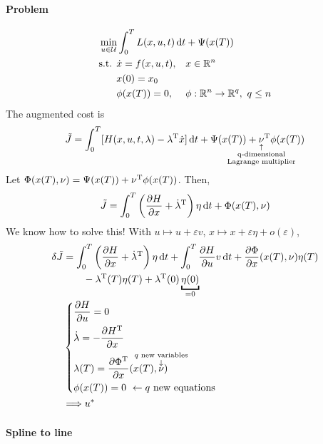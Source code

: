 \paragraph{Problem}
\begin{align}
  & \min_{u\in\mathcal U} \int_0^T L(x,u,t)\mathop{}\!\mathrm{d} t + \Psi(x(T)) \\
  & \text{s.t. } \begin{aligned}[t]
    & \dot x = f(x,u,t), && x\in\mathbb{R}^n \\
    & x(0) = x_0 \\
    & \phi(x(T)) = 0, && \phi:\mathbb{R}^n\to\mathbb{R}^q,\ q\le n
  \end{aligned}
\end{align}
The augmented cost is
\[
  \tilde J = \int_0^T [ H(x,u,t,\lambda) - \lambda\trans \dot x]\dif t + \Psi(x(T)) + \underset{\mathclap{\substack{\uparrow\\ \text{q-dimensional}\\ \text{Lagrange multiplier}}}}{\nu}\trans \phi(x(T))
\]
Let $\Phi(x(T),\nu)=\Psi(x(T)) + \nu^\text{T}\phi(x(T))$. Then,
\[
  \tilde J = \int_0^T \left( \frac{\partial H}{\partial x} + \dot\lambda^\text{T} \right) \eta \mathop{}\!\mathrm{d} t + \Phi(x(T),\nu)
\]
We know how to solve this! With $u\mapsto u+\varepsilon v$, $x\mapsto x+\varepsilon\eta + o(\varepsilon)$,
\begin{align}
  \delta \tilde J &= \int_0^T \left(\pder{H}{x} + \dot\lambda\trans\right)\eta\dif t + \int_0^T \pder{H}{u}v \dif t + \pder{\Phi}{x}(x(T),\nu)\eta(T) \\
                  & \qquad - \lambda\trans(T)\eta(T) + \lambda\trans(0)\underbracket{\eta(0)}_{=0} \\
                  & \begin{dcases}
                    \pder{H}{u} = 0 \\
                    \dot\lambda = -\pder{H\trans}{x} \\
                    \lambda(T) = \pder{\Phi\trans}{x}( x(T), \overset{\mathclap{\substack{q \text{ new variables}\\ \downarrow}}}{\nu} ) \\
                    \phi(x(T)) = 0 \ \leftarrow q \text{ new equations}
                  \end{dcases} \\
                  & \Longrightarrow u^*
\end{align}

\paragraph{Spline to line}

